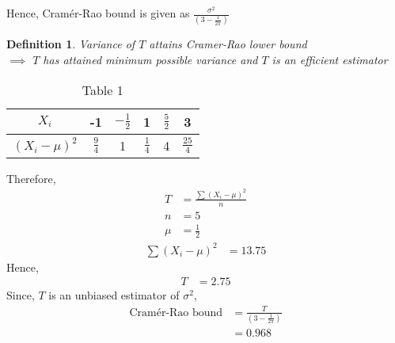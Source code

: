 \documentclass[journal,12pt,onecolumn]{IEEEtran}
\newtheorem{definition}[problem]{Definition}
\theoremstyle{remark}
\begin{document}
Hence, Cramér-Rao bound is given as $\frac{\sigma^2}{\left(3 - \frac{1}{2\pi}\right)}$
\begin{definition}
Variance of $T$ attains Cramer-Rao lower bound\\
\(\implies\) $T$ has attained minimum possible variance and $T$ is an efficient estimator
\end{definition}
\begin{table}[h!]
 \begin{center}
    \begin{tabular}{|c|c|c|c|c|c|}
    \hline
    $X_i$ & -1 & $-\frac{1}{2}$ & 1 & $\frac{5}{2}$ & 3\\
    \hline
    $({X_i} - \mu)^{2}$ & $\frac{9}{4}$ & 1 & $\frac{1}{4}$ & 4 & $\frac{25}{4}$\\
    \hline
    \end{tabular}
    \end{center}
    \caption{Table 1}
  \label{tab:GATE/2023/ST/63/} 
\end{table}
Therefore,
\begin{align}
T &= \frac{\sum (X_i - \mu)^{2}}{n}\\
n &= 5\\
\mu &= \frac{1}{2}
\end{align}
\begin{align}
\sum (X_i - \mu)^{2} &= 13.75
\end{align}
Hence,
\begin{align}
T &= 2.75
\end{align}
Since, $T$ is an unbiased estimator of $\sigma^2$,
\begin{align}
\text {Cramér-Rao bound} &= \frac{T}{\left(3 - \frac{1}{2\pi}\right)}\\
&= 0.968
\end{align}
\end{document}
